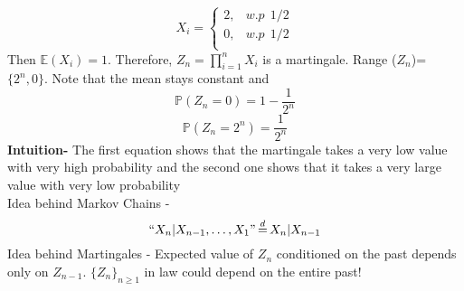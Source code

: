 \documentclass[main]{subfiles}
\begin{document}
\ex
\begin{equation*}
  X_i=
  \begin{cases}
    2 , & w.p ~~ 1/2 \\
    0 , & w.p ~~1/2  \\
  \end{cases}
\end{equation*}
Then $\mathbb{E} (X_i)=1$. Therefore, $Z_n= \prod_{i=1}^n X_i$ is a martingale. Range ($Z_n$)= $\{2^n,0\}$. Note that the mean stays constant and
$$\mathbb{P}(Z_n=0)=1-\frac{1}{2^n}$$
$$\mathbb{P}(Z_n=2^n)=\frac{1}{2^n}$$
\textbf{Intuition-} The first equation shows that the martingale takes a very low value with very high probability and the second one shows that it takes a very large value with very low probability\\
Idea behind Markov Chains -
$$``X_n | X_{n-1}, \ldots, X_1" \,{\buildrel d \over =}\, X_n|X_{n-1}$$
Idea behind Martingales -
Expected value of $Z_n$ conditioned on the past depends only on $Z_{n-1}$. $\{Z_n\}_{n \geq 1}$ in law could depend on the entire past!
\end{document}
